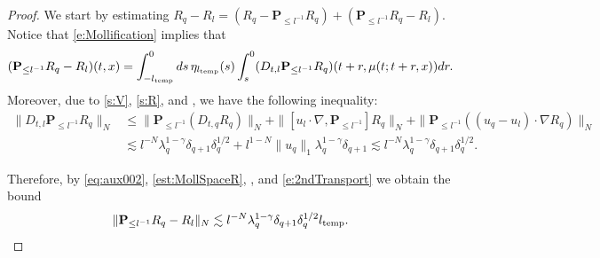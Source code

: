 \documentclass[10pt,a4paper]{amsart}
\numberwithin{equation}{section}
\numberwithin{corollario}{section}
\numberwithin{lemma}{section}
\numberwithin{prop}{section}
\theoremstyle{definition}
\theoremstyle{remark}
\newcommand{\proj}{\mathbf{P}}
\newcommand{\qq}{_{q+1}}
\begin{document}
\begin{proof}
   We start by estimating $R_q-R_l 
   =(R_q-\proj_{\le l^{-1}}R_q)+(\proj_{\le l^{-1}}R_q-R_l).$
   Notice that \eqref{e:Mollification} implies that
   \begin{equation} \label{eq:aux002}
       (\proj_{\le l^{-1}}R_q-R_l)(t,x)=\int_{-l_{\rm temp}}^0ds\,\eta_{l_{\rm temp}}(s)\int_s^0(D_{t,l}\proj_{\le l^{-1}}R_q)(t+r,\mu(t;t+r,x))dr.
   \end{equation}
Moreover, due to \eqref{s:V}, \eqref{s:R}, and \cite[Lemma A.4]{DLK23}, we have the following inequality:
\begin{align}\label{est:MollSpaceR}
           \|D_{t,l}\proj_{\le l^{-1}}R_q\|_N&\le \|\proj_{\le l^{-1}}(D_{t,q}R_q)\|_N+\|[u_l\cdot \nabla, \proj_{\le l^{-1}}]R_q\|_N+\|\proj_{\le l^{-1}}((u_q-u_l)\cdot \nabla R_q)\|_N\\
           &\lesssim l^{-N}\lambda_q^{1-\gamma}\delta\qq\delta_q^{1/2}+l^{1-N}\|u_q\|_1\lambda^{1-\gamma}_q\delta\qq \lesssim l^{-N}\lambda_q^{1-\gamma}\delta\qq \delta_q^{1/2}.
       \end{align}

   Therefore, by \eqref{eq:aux002}, \eqref{est:MollSpaceR}, \cite[Proposition C.1]{BD15+}, and \eqref{e:2ndTransport} we obtain the bound
   \begin{equation}\label{est:RT1}
       \|\proj_{\le l^{-1}}R_q-R_l\|_N\lesssim l^{-N}\lambda_q^{1-\gamma}\delta\qq \delta_q^{1/2} l_{\rm temp}.
   \end{equation}



\end{proof}
\end{document}
